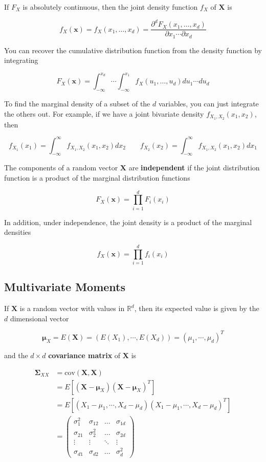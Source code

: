 \documentclass[11pt]{article}
\theoremstyle{definition}
\begin{document}
If $F_X$ is absolutely continuous, then the joint density function $f_X$ of $\mathbf{X}$ is

$$f_X(\mathbf{x}) = f_X(x_1, \hdots, x_d) = \frac{\partial ^d F_X(x_1, \hdots, x_d)}{\partial x_1 \cdots \partial x_d}$$

You can recover the cumulative distribution function from the density function by integrating 

$$F_X(\mathbf{x}) = \int_{-\infty}^{x_d} \cdots \int_{-\infty}^{x_1} f_X(u_1, \hdots, u_d) du_1 \cdots du_d$$

To find the marginal density of a subset of the $d$ variables, you can just integrate the others out.  For example, if we have a joint bivariate density $f_{X_1,X_2}(x_1, x_2)$, then 

$$f_{X_1}(x_1) = \int_{-\infty}^{\infty} f_{X_1,X_2}(x_1, x_2) dx_2 \qquad f_{X_2}(x_2) = \int_{-\infty}^{\infty} f_{X_1,X_2}(x_1, x_2) dx_1$$

The components of a random vector $\mathbf{X}$ are \textbf{independent} if the joint distribution function is a product of the marginal distribution functions

$$F_X(\mathbf{x}) = \prod_{i=1}^d F_i(x_i)$$

In addition, under independence, the joint density is a product of the marginal densities

$$f_X(\mathbf{x}) = \prod_{i=1}^d f_i(x_i)$$
\subsection{Multivariate Moments}
If $\mathbf{X}$ is a random vector with values in $\mathbb{R}^d$, then its expected value is given by the $d$ dimensional vector

$$\mathbf{\mu}_X = E(\mathbf{X}) = (E(X_1), \cdots, E(X_d)) = (\mu_1, \cdots, \mu_d)^T$$

and the $d \times d$ \textbf{covariance matrix} of $\mathbf{X}$ is 

\begin{align*}
\mathbf{\Sigma}_{XX} &= \text{cov}(\mathbf{X}, \mathbf{X}) \\
&= E[(\mathbf{X} - \mathbf{\mu}_X)(\mathbf{X} - \mathbf{\mu}_X)^T]\\
&= E[(X_1 - \mu_1, \cdots, X_d - \mu_d) (X_1 - \mu_1, \cdots, X_d - \mu_d)^T]\\
&= 
\begin{pmatrix}
    \sigma_1^2 & \sigma_{12} & \dots  & \sigma_{1d}\\
    \sigma_{21} & \sigma_2^2  & \dots  & \sigma_{2d}\\
    \vdots & \vdots  & \ddots & \vdots \\
    \sigma_{d1} & \sigma_{d2}  & \dots  & \sigma_d^2
\end{pmatrix}
\end{align*} 
\end{document}
